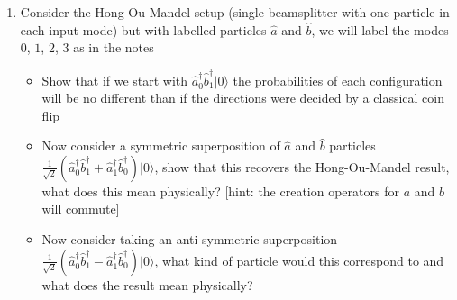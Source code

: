 \documentclass[english]{article}
\newcommand{\ket}[1]{|#1 \rangle}
\begin{document}
\begin{enumerate}
\begin{itemize}
\item Use the previous result to argue that the frequency distribution attained by applying a shutter to a single mode at $\omega_p$ will give a frequency distribution of $\tilde{g}(\omega)=\frac{2\sin((\omega-\omega_p) t_0)}{\omega-\omega_p}$
\item Find the Fourier transform of the following function, corresponding to a system which is turned on and has an exponential decay envelope defined by $\gamma$, where $\Theta$ is the Heviside Theta function)
\begin{equation}
\Theta(t)\exp(i \omega_p t-\gamma t) 
\end{equation}
Show that it gives
\begin{equation}
 \tilde{g}(\omega)=-\frac{1}{i(\omega_p-\omega)-\gamma}
 \end{equation}
separate into real and imaginary parts and argue that in the limit $\gamma \rightarrow 0$, the real part of this function becomes a Dirac delta centred at $\omega=\omega_p$, while the imaginary part remains a function with finite width, what does this finite width mean physically? [hint: a useful identity which can be shown by contour integration (or Wolfram alpha), that  $\int_{-\infty}^{\infty}d\omega\frac{\gamma}{\omega^2+\gamma^2}=\pi$ independent of $\gamma$]
\end{itemize}
\item Consider the Hong-Ou-Mandel setup (single beamsplitter with one particle in each input mode) but with labelled particles $\hat{a}$ and $\hat{b}$, we will label the modes $0$, $1$, $2$, $3$ as in the notes
\begin{itemize}
\item Show that if we start with $\hat{a}^\dagger_0\hat{b}^\dagger_1\ket{0}$ the probabilities of each configuration will be no different than if the directions were decided by a classical coin flip
\item Now consider a symmetric superposition of $\hat{a}$ and $\hat{b}$ particles $\frac{1}{\sqrt{2}}(\hat{a}^\dagger_0\hat{b}^\dagger_1+\hat{a}^\dagger_1\hat{b}^\dagger_0)\ket{0}$, show that this recovers the Hong-Ou-Mandel result, what does this mean physically? [hint: the creation operators for $a$ and $b$ will commute]
\item Now consider taking an anti-symmetric superposition  $\frac{1}{\sqrt{2}}(\hat{a}^\dagger_0\hat{b}^\dagger_1-\hat{a}^\dagger_1\hat{b}^\dagger_0)\ket{0}$, what kind of particle would this correspond to and what does the result mean physically?
\end{itemize}
\end{enumerate}
\end{document}
